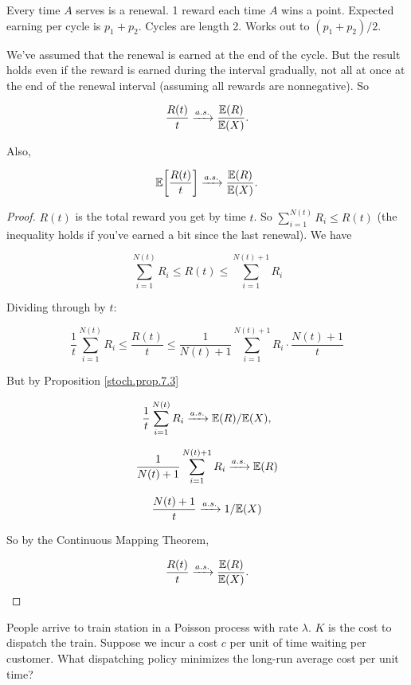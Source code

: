 \begin{solution} Every time \(A\) serves is a renewal. 1 reward each time \(A\) wins a point. Expected earning per cycle is \(p_1 + p_2\). Cycles are length 2. Works out to \((p_1 + p_2)/2\).


\end{solution}

\begin{proposition}We've assumed that the renewal is earned at the end of the cycle. But the result holds even if the reward is earned during the interval gradually, not all at once at the end of the renewal interval (assuming all rewards are nonnegative). So

\[
\frac{R(t)}{t} \xrightarrow{a.s.} \frac{\E(R)}{\E(X)}.
\]

Also,

\[
\E \bigg[ \frac{R(t)}{t} \bigg] \xrightarrow{a.s.} \frac{\E(R)}{\E(X)}.
\]

\end{proposition}


\begin{proof}
\(R(t)\) is the total reward you get by time \(t\). So \(\sum_{i=1}^{N(t)} R_i \leq R(t)\) (the inequality holds if you've earned a bit since the last renewal). We have

\[
\sum_{i=1}^{N(t)} R_i \leq R(t) \leq \sum_{i=1}^{N(t) + 1} R_i
\]

Dividing through by \(t\):

\[
\frac{1}{t} \sum_{i=1}^{N(t)} R_i \leq  \frac{R(t)}{t}  \leq  \frac{1}{N(t) + 1} \sum_{i=1}^{N(t) + 1} R_i \cdot \frac{N(t)+1}{t} 
\]

But by Proposition \ref{stoch.prop.7.3}

\[
\frac{1}{t} \sum_{i=1}^{N(t)} R_i  \xrightarrow{a.s.} \E(R)/\E(X),
\]

\[
\frac{1}{N(t) + 1} \sum_{i=1}^{N(t) + 1} R_i  \xrightarrow{a.s.} \E(R)
\]

\[
\frac{N(t)+1}{t}  \xrightarrow{a.s.} 1/\E(X)
\]

So by the Continuous Mapping Theorem,

\[
\frac{R(t)}{t} \xrightarrow{a.s.} \frac{\E(R)}{\E(X)}.
\]
\end{proof}

\begin{example} People arrive to train station in a Poisson process with rate \(\lambda\). \(K\) is the cost to dispatch the train. Suppose we incur a cost \(c\) per unit of time waiting per customer. What dispatching policy minimizes the long-run average cost per unit time?

\end{example}

